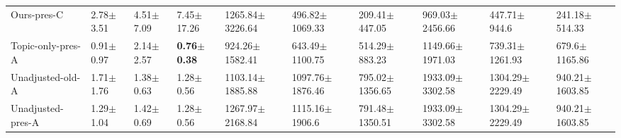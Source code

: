 \begin{tabular}{llllllllll}
Ours-pres-C         &           2.78$\pm$3.51 &           4.51$\pm$7.09 &          7.45$\pm$17.26 &         1265.84$\pm$3226.64 &          496.82$\pm$1069.33 &           209.41$\pm$447.05 &           969.03$\pm$2456.66 &            447.71$\pm$944.6 &           241.18$\pm$514.33 \\
Topic-only-pres-A   &           0.91$\pm$0.97 &           2.14$\pm$2.57 &  \textbf{0.76$\pm$0.38} &          924.26$\pm$1582.41 &          643.49$\pm$1100.75 &           514.29$\pm$883.23 &          1149.66$\pm$1971.03 &          739.31$\pm$1261.93 &           679.6$\pm$1165.86 \\
Unadjusted-old-A    &           1.71$\pm$1.76 &           1.38$\pm$0.63 &           1.28$\pm$0.56 &         1103.14$\pm$1885.88 &         1097.76$\pm$1876.46 &          795.02$\pm$1356.65 &          1933.09$\pm$3302.58 &         1304.29$\pm$2229.49 &          940.21$\pm$1603.85 \\
Unadjusted-pres-A   &           1.29$\pm$1.04 &           1.42$\pm$0.69 &           1.28$\pm$0.56 &         1267.97$\pm$2168.84 &          1115.16$\pm$1906.6 &          791.48$\pm$1350.51 &          1933.09$\pm$3302.58 &         1304.29$\pm$2229.49 &          940.21$\pm$1603.85 \\
\bottomrule
\end{tabular}
